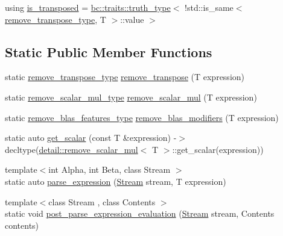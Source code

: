 \begin{DoxyCompactItemize}
\item 
using \hyperlink{structbc_1_1tensors_1_1exprs_1_1blas__expression__traits_ad944ad00fbdc044e06e7f90771514e3c}{is\+\_\+transposed} = \hyperlink{namespacebc_1_1traits_ac91a9795000ae7f483efbaf74c9872e8}{bc\+::traits\+::truth\+\_\+type}$<$ !std\+::is\+\_\+same$<$ \hyperlink{structbc_1_1tensors_1_1exprs_1_1blas__expression__traits_afb08d790861ec86e53b6c53f46fbb826}{remove\+\_\+transpose\+\_\+type}, T $>$\+::value $>$
\end{DoxyCompactItemize}
\subsection*{Static Public Member Functions}
\begin{DoxyCompactItemize}
\item 
static \hyperlink{structbc_1_1tensors_1_1exprs_1_1blas__expression__traits_afb08d790861ec86e53b6c53f46fbb826}{remove\+\_\+transpose\+\_\+type} \hyperlink{structbc_1_1tensors_1_1exprs_1_1blas__expression__traits_ad14f680b6e3afb078d6d2211ced2e53f}{remove\+\_\+transpose} (T expression)
\item 
static \hyperlink{structbc_1_1tensors_1_1exprs_1_1blas__expression__traits_a69dacf887c1ca2cf443865bd4668ccfe}{remove\+\_\+scalar\+\_\+mul\+\_\+type} \hyperlink{structbc_1_1tensors_1_1exprs_1_1blas__expression__traits_aaa1e5450c4103607193f591f900dbf68}{remove\+\_\+scalar\+\_\+mul} (T expression)
\item 
static \hyperlink{structbc_1_1tensors_1_1exprs_1_1blas__expression__traits_afa81b694f7f66b5974416f37e90b148f}{remove\+\_\+blas\+\_\+features\+\_\+type} \hyperlink{structbc_1_1tensors_1_1exprs_1_1blas__expression__traits_a5c0da9d80709a4e1b3a408b9617e1d46}{remove\+\_\+blas\+\_\+modifiers} (T expression)
\item 
static auto \hyperlink{structbc_1_1tensors_1_1exprs_1_1blas__expression__traits_a0e9c6280e2c88c35604999b3bc717e99}{get\+\_\+scalar} (const T \&expression) -\/$>$ decltype(\hyperlink{structbc_1_1tensors_1_1exprs_1_1detail_1_1remove__scalar__mul}{detail\+::remove\+\_\+scalar\+\_\+mul}$<$ T $>$\+::get\+\_\+scalar(expression))
\item 
{\footnotesize template$<$int Alpha, int Beta, class Stream $>$ }\\static auto \hyperlink{structbc_1_1tensors_1_1exprs_1_1blas__expression__traits_ad6f0da96452eb001b28b15f5f17b38a3}{parse\+\_\+expression} (\hyperlink{classbc_1_1streams_1_1Stream}{Stream} stream, T expression)
\item 
{\footnotesize template$<$class Stream , class Contents $>$ }\\static void \hyperlink{structbc_1_1tensors_1_1exprs_1_1blas__expression__traits_a19657281871c89a178a6e47a7589acb4}{post\+\_\+parse\+\_\+expression\+\_\+evaluation} (\hyperlink{classbc_1_1streams_1_1Stream}{Stream} stream, Contents contents)
\end{DoxyCompactItemize}



